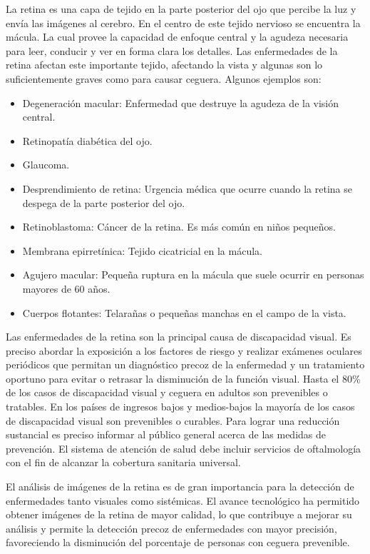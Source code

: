 La retina es una capa de tejido en la parte posterior del ojo que percibe la luz y env\'ia las im\'agenes al cerebro. En el centro de este tejido nervioso se encuentra la m\'acula. La cual provee la capacidad de enfoque central y la agudeza necesaria para leer, conducir y ver en forma clara los detalles. Las enfermedades de la retina afectan este importante tejido, afectando la vista y algunas son lo suficientemente graves como para causar ceguera. Algunos ejemplos son:
\begin{itemize}
\item Degeneraci\'on macular: Enfermedad que destruye la agudeza de la visi\'on central.
\item Retinopat\'ia diab\'etica del ojo.
\item Glaucoma.
\item Desprendimiento de retina: Urgencia m\'edica que ocurre cuando la retina se despega de la parte posterior del ojo.
\item Retinoblastoma: C\'ancer de la retina. Es m\'as com\'un en niños pequeños.
\item Membrana epirret\'inica: Tejido cicatricial en la m\'acula.
\item Agujero macular: Pequeña ruptura en la m\'acula que suele ocurrir en personas mayores de 60 años.
\item Cuerpos flotantes: Telarañas o pequeñas manchas en el campo de la vista.
\end{itemize}
Las enfermedades de la retina son la principal causa de discapacidad visual. Es preciso abordar la exposici\'on a los factores de riesgo y realizar ex\'amenes oculares peri\'odicos que permitan un diagn\'ostico precoz de la enfermedad y un tratamiento oportuno para evitar o retrasar la  disminuci\'on de la funci\'on visual. Hasta el 80\% de los casos de discapacidad visual y ceguera en adultos son prevenibles o tratables. En los pa\'ises de ingresos bajos y medios-bajos la mayor\'ia de los casos de discapacidad visual son prevenibles o curables. Para lograr una reducci\'on sustancial es preciso informar al p\'ublico general acerca de las medidas de prevenci\'on. El sistema de atenci\'on de salud debe incluir servicios de oftalmolog\'ia con el fin de alcanzar la cobertura sanitaria universal.

El an\'alisis de im\'agenes de la retina es de gran importancia para la detecci\'on de enfermedades tanto visuales como sist\'emicas.
El avance tecnol\'ogico ha permitido obtener im\'agenes de la retina de mayor calidad, lo que contribuye a mejorar su an\'alisis y permite la detecci\'on precoz de enfermedades con mayor precisi\'on, favoreciendo la disminuci\'on del porcentaje de personas con ceguera prevenible. 

